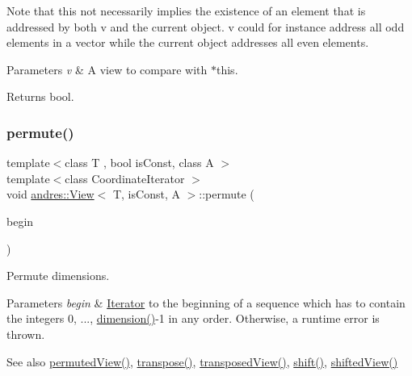 Note that this not necessarily implies the existence of an element that is addressed by both v and the current object. v could for instance address all odd elements in a vector while the current object addresses all even elements.


\begin{DoxyParams}{Parameters}
{\em v} & A view to compare with $\ast$this. \\
\hline
\end{DoxyParams}
\begin{DoxyReturn}{Returns}
bool. 
\end{DoxyReturn}
\mbox{\label{classandres_1_1View_a375d3e199e219568d8a6205e4088289b}} 
\subsubsection{\texorpdfstring{permute()}{permute()}}
{\footnotesize\ttfamily template$<$class T , bool is\+Const, class A $>$ \\
template$<$class Coordinate\+Iterator $>$ \\
void \hyperlink{classandres_1_1View}{andres\+::\+View}$<$ T, is\+Const, A $>$\+::permute (\begin{DoxyParamCaption}\item[{Coordinate\+Iterator}]{begin }\end{DoxyParamCaption})}

Permute dimensions.


\begin{DoxyParams}{Parameters}
{\em begin} & \hyperlink{classandres_1_1Iterator}{Iterator} to the beginning of a sequence which has to contain the integers 0, ..., \hyperlink{classandres_1_1View_a836c6755b62d6e619d043adcf8b91fab}{dimension()}-\/1 in any order. Otherwise, a runtime error is thrown. \\
\hline
\end{DoxyParams}
\begin{DoxySeeAlso}{See also}
\hyperlink{classandres_1_1View_ad5ff9254de815d85b6c6748bad3fcd89}{permuted\+View()}, \hyperlink{classandres_1_1View_ad7acad354a5be4086b9b21ab88b18d82}{transpose()}, \hyperlink{classandres_1_1View_a98a4c17bd2faa51788f6fd533a429e73}{transposed\+View()}, \hyperlink{classandres_1_1View_a476957393b3b21333bc665e852da47ad}{shift()}, \hyperlink{classandres_1_1View_abc938823dc964548f0f44ab10bca6b59}{shifted\+View()} 
\end{DoxySeeAlso}
\mbox{\label{classandres_1_1View_ad5ff9254de815d85b6c6748bad3fcd89}} 
